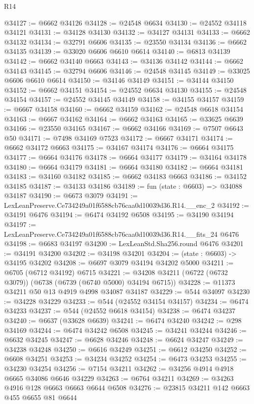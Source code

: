 \begin{lexlean}{R14}
\begin{coremodule}
@34127 := @6662 @34126
@34128 := @24548 @6634
@34130 := @24552 @34118 @34121
@34131 := @34128 @34130
@34132 := @34127 @34131
@34133 := @6662 @34132
@34134 := @32791 @6606
@34135 := @23550 @34134
@34136 := @6662 @34135
@34139 := @33020 @6606 @6610 @6614
@34140 := @6813 @34139
@34142 := @6662 @34140 @6663
@34143 := @34136 @34142
@34144 := @6662 @34143
@34145 := @32794 @6606
@34146 := @24548 @34145
@34149 := @33025 @6606 @6610 @6614
@34150 := @34146 @34149
@34151 := @34144 @34150
@34152 := @6662 @34151
@34154 := @24552 @6634 @34130
@34155 := @24548 @34154
@34157 := @24552 @34145 @34149
@34158 := @34155 @34157
@34159 := @6667 @34158
@34160 := @6662 @34159
@34162 := @24548 @6618 @34154
@34163 := @6667 @34162
@34164 := @6662 @34163
@34165 := @33625 @6639
@34166 := @23550 @34165
@34167 := @6662 @34166
@34169 := @7507 @6643 @50
@34171 := @7498 @34169 @7523
@34172 := @6667 @34171
@34174 := @6662 @34172 @6663
@34175 := @34167 @34174
@34176 := @6664 @34175
@34177 := @6664 @34176
@34178 := @6664 @34177
@34179 := @34164 @34178
@34180 := @6664 @34179
@34181 := @6664 @34180
@34182 := @6664 @34181
@34183 := @34160 @34182
@34185 := @6662 @34183 @6663
@34186 := @34152 @34185
@34187 := @34133 @34186
@34189 := fun (state : @6603) => @34088 @34187
@34190 := @6673 @3079
@34191 := LexLeanPreserve.Ce734249a01f6588cb76caa0d10039d36.R14.__enc_2
@34192 := @34191 @6476
@34194 := @6474 @34192 @6508
@34195 := @34190 @34194
@34197 := LexLeanPreserve.Ce734249a01f6588cb76caa0d10039d36.R14.__fits_24 @6476
@34198 := @6683 @34197
@34200 := LexLeanStd.Sha256.round @6476
@34201 := @34191 @34200
@34202 := @34198 @34201
@34204 := (state : @6603) -> @34195 @34202
@34208 := @6697 @3079 @34194 @34202 @5000
@34211 := @6705 (@6712 @34192) @6715
@34221 := @34208 @34211 (@6722 (@6732 @3079)) (@6738 (@6739 (@6740 @5000) @34194 @6715))
@34228 := @11373 @34211 @50 @13 @4919 @4998 @34087 @34187
@34229 := @544 @34097
@34230 := @34228 @34229
@34233 := @544 (@24552 @34154 @34157)
@34234 := @6474 @34233
@34237 := @544 (@24552 @6618 @34154)
@34238 := @6474 @34237
@34240 := @6637 (@33628 @6639)
@34241 := @6474 @34240
@34242 := @298 @34169
@34244 := @6474 @34242 @6508
@34245 := @34241 @34244
@34246 := @6632 @34245
@34247 := @6628 @34246
@34248 := @6624 @34247
@34249 := @34238 @34248
@34250 := @6616 @34249
@34251 := @6612 @34250
@34252 := @6608 @34251
@34253 := @34234 @34252
@34254 := @6473 @34253
@34255 := @34230 @34254
@34256 := @7154 @34211
@34262 := @34256 @4914 @4918 @6665 @34086 @6646 @34229
@34263 := @6764 @34211
@34269 := @34263 @4916 @128 @6663 @6663 @6644 @6508
@34276 := @23815 @34211 @142 @6663 @455 @6655 @81 @6644

\end{coremodule}
\end{lexlean}
